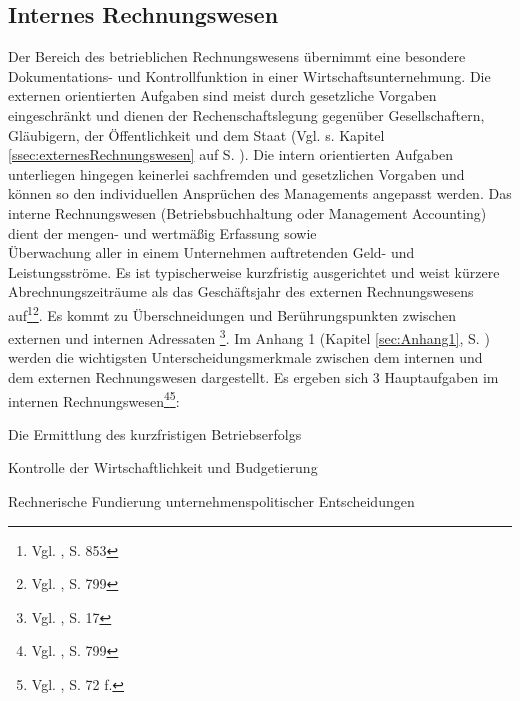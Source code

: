 \subsection{Internes Rechnungswesen}
\label{ssec:internesRechnungswesen}

Der Bereich des betrieblichen Rechnungswesens übernimmt eine besondere Dokumentations- und Kontrollfunktion in einer Wirtschaftsunternehmung.
Die externen orientierten Aufgaben sind meist durch gesetzliche Vorgaben eingeschränkt und dienen der Rechenschaftslegung gegenüber Gesellschaftern, Gläubigern, der Öffentlichkeit und dem Staat (Vgl. s. Kapitel \ref{ssec:externesRechnungswesen} auf S. \pageref{ssec:externesRechnungswesen}).
Die intern orientierten Aufgaben unterliegen hingegen keinerlei sachfremden und gesetzlichen Vorgaben und können so den individuellen Ansprüchen des Managements angepasst werden. Das interne Rechnungswesen (Betriebsbuchhaltung oder Management Accounting) dient der mengen- und wertmäßig Erfassung sowie\\ Überwachung aller in einem Unternehmen auftretenden Geld- und Leistungsströme. Es ist typischerweise kurzfristig ausgerichtet und weist kürzere Abrechnungszeiträume als das Geschäftsjahr des externen Rechnungswesens auf\footnote{Vgl. \cite{Wohe2000}, S. 853}\footnote{Vgl. \cite{Schierenbeck2008}, S. 799}. Es kommt zu Überschneidungen 
und Berührungspunkten zwischen externen und internen Adressaten \footnote{Vgl. \cite{Muller2006}, S. 17}.
Im Anhang 1 (Kapitel \ref{sec:Anhang1}, S. \pageref{sec:Anhang1}) werden die wichtigsten Unterscheidungsmerkmale zwischen dem internen und dem externen Rechnungswesen dargestellt.
\noindent Es ergeben sich 3 Hauptaufgaben im internen Rechnungswesen\footnote{Vgl. \cite{Schierenbeck2008}, S. 799}\footnote{Vgl. \cite{Baetge2008}, S. 72 f.}:
\begin{compactitem}
\item[1] Die Ermittlung des kurzfristigen Betriebserfolgs
\item[2] Kontrolle der Wirtschaftlichkeit und Budgetierung
\item[3] Rechnerische Fundierung unternehmenspolitischer Entscheidungen
\end{compactitem}
